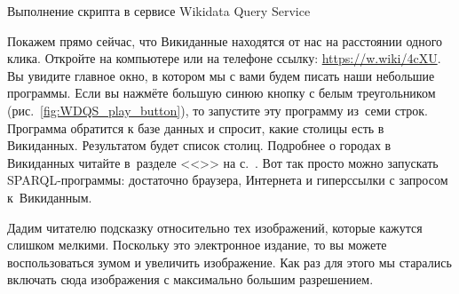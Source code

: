 \newpage
\begin{marginfigure}%
{%
\setlength{\fboxsep}{0pt}%
\setlength{\fboxrule}{1pt}%
}
\caption{Выполнение скрипта в сервисе Wikidata Query Service}
\label{fig:WDQS_play_button}%
\end{marginfigure}%
Покажем прямо сейчас, что Викиданные находятся от нас на расстоянии одного клика.
Откройте на компьютере или на телефоне ссылку: 
\href{https://w.wiki/4cXU}{https://w.wiki/4cXU}. 
Вы увидите главное окно, в котором мы с вами будем писать наши небольшие программы. 
Если вы нажмёте большую синюю кнопку с белым треугольником (рис.~\ref{fig:WDQS_play_button}), 
то запустите эту программу из~семи строк. 
Программа обратится к базе данных 
и спросит, какие столицы есть в Викиданных. Результатом будет список столиц. %
%
Подробнее о городах в Викиданных читайте в~разделе <<>> на с.~\pageref{ch:city}. 
Вот так просто можно запускать SPARQL-программы: достаточно браузера, 
Интернета и гиперссылки с запросом к~Викиданным.

Дадим читателю подсказку относительно тех изображений, которые кажутся слишком мелкими. Поскольку это электронное издание, то вы можете воспользоваться зумом и увеличить изображение. Как раз для этого мы старались включать сюда изображения с максимально большим разрешением. 


